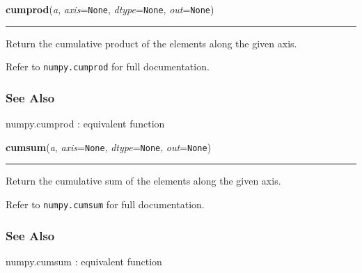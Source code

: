     \label{numpy:ndarray:cumprod}

    \vspace{0.5ex}

    \begin{boxedminipage}{\textwidth}

    \raggedright \textbf{cumprod}(\textit{a}, \textit{axis}=\texttt{None}, \textit{dtype}=\texttt{None}, \textit{out}=\texttt{None})

    \vspace{-1.5ex}

    \rule{\textwidth}{0.5\fboxrule}

Return the cumulative product of the elements along the given axis.

Refer to \texttt{numpy.cumprod} for full documentation.



\hypertarget{see-also}{}
\subsubsection*{See Also}

numpy.cumprod : equivalent function
    \vspace{1ex}

    \end{boxedminipage}

    \label{numpy:ndarray:cumsum}

    \vspace{0.5ex}

    \begin{boxedminipage}{\textwidth}

    \raggedright \textbf{cumsum}(\textit{a}, \textit{axis}=\texttt{None}, \textit{dtype}=\texttt{None}, \textit{out}=\texttt{None})

    \vspace{-1.5ex}

    \rule{\textwidth}{0.5\fboxrule}

Return the cumulative sum of the elements along the given axis.

Refer to \texttt{numpy.cumsum} for full documentation.



\hypertarget{see-also}{}
\subsubsection*{See Also}

numpy.cumsum : equivalent function
    \vspace{1ex}

    \end{boxedminipage}

